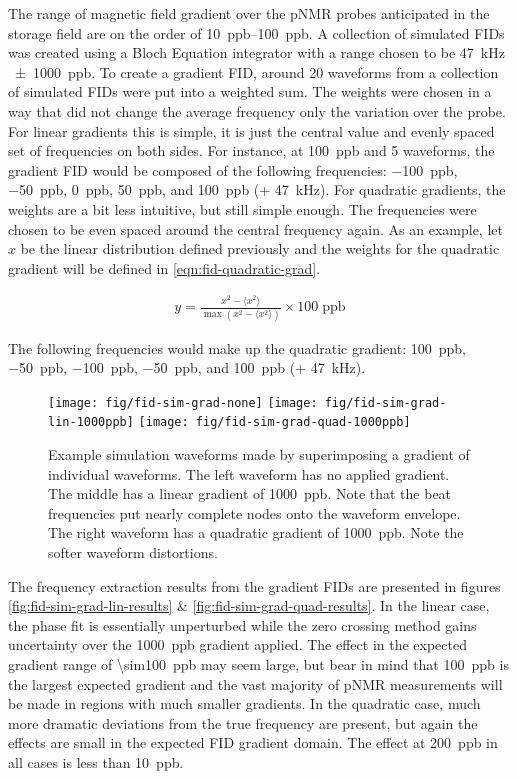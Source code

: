 The range of magnetic field gradient over the pNMR probes anticipated in the \gmtwo storage field are on the order of \SIrange{10}{100}{ppb}. A collection of simulated FIDs was created using a Bloch Equation integrator with a range chosen to be \SI{47}{\kHz} \SI{\pm 1000}{ppb}. To create a gradient FID, around 20 waveforms from a collection of simulated FIDs were put into a weighted sum.  The weights were chosen in a way that did not change the average frequency only the variation over the probe.  For linear gradients this is simple, it is just the central value and evenly spaced set of frequencies on both sides.  For instance, at \SI{100}{ppb} and 5 waveforms, the gradient FID would be composed of the following frequencies: \SI{-100}{ppb}, \SI{-50}{ppb}, \SI{0}{ppb}, \SI{50}{ppb}, and \SI{100}{ppb} (+ \SI{47}{\kHz}).  For quadratic gradients, the weights are a bit less intuitive, but still simple enough.  The frequencies were chosen to be even spaced around the central frequency again.  As an example, let $x$ be the linear distribution defined previously and the weights for the quadratic gradient will be defined in \ref{eqn:fid-quadratic-grad}.

\begin{align}
\label{eqn:fid-quadratic-grad}
y = \frac{x^2 - \langle x^2 \rangle}{\max{(x^2 - \langle x^2 \rangle)}} \times \mathrm{100\; ppb}
\end{align}

\noindent
The following frequencies would make up the quadratic gradient: \SI{100}{ppb}, \SI{-50}{ppb}, \SI{-100}{ppb}, \SI{-50}{ppb}, and \SI{100}{ppb} (+ \SI{47}{\kHz}).

\begin{figure}
\centering
\texttt{[image: fig/fid-sim-grad-none]}
\texttt{[image: fig/fid-sim-grad-lin-1000ppb]}
\texttt{[image: fig/fid-sim-grad-quad-1000ppb]}
\caption{
    Example simulation waveforms made by superimposing a gradient of individual waveforms.  The left waveform has no applied gradient.  The middle has a linear gradient of \SI{1000}{ppb}.  Note that the beat frequencies put nearly complete nodes onto the waveform envelope.  The right waveform has a quadratic gradient of \SI{1000}{ppb}.  Note the softer waveform distortions.
    \label{fig:fid-sim-grad}
}
\end{figure}

The frequency extraction results from the gradient FIDs are presented in figures \ref{fig:fid-sim-grad-lin-results} \& \ref{fig:fid-sim-grad-quad-results}.  In the linear case, the phase fit is essentially unperturbed while the zero crossing method gains uncertainty over the \SI{1000}{ppb} gradient applied.  The effect in the expected gradient range of \SI{\sim100}{ppb} may seem large, but bear in mind that \SI{100}{ppb} is the largest expected gradient and the vast majority of pNMR measurements will be made in regions with much smaller gradients.  In the quadratic case, much more dramatic deviations from the true frequency are present, but again the effects are small in the expected FID gradient domain.  The effect at \SI{200}{ppb} in all cases is less than \SI{10}{ppb}.


